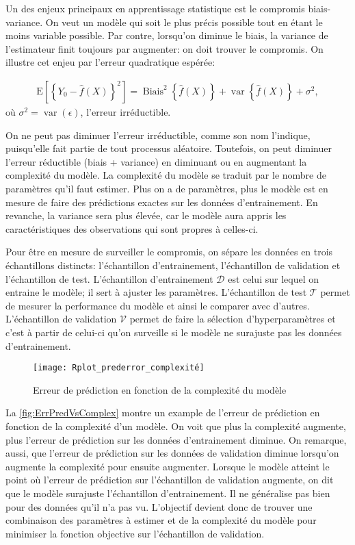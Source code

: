 Un des enjeux principaux en apprentissage statistique est le compromis biais-variance. On veut un modèle qui soit le plus précis possible tout en étant le moins variable possible. Par contre, lorsqu'on diminue le biais, la variance de l'estimateur finit toujours par augmenter: on doit trouver le compromis. On illustre cet enjeu par l'erreur quadratique espérée:

\begin{align*}\mathrm{E}\left[\left\{Y_{0}-\hat{f}\left(X\right)\right\}^{2}\right]=\operatorname{Biais}^{2}\left\{\hat{f}\left(X\right)\right\}+\operatorname{var}\left\{\hat{f}\left(X\right)\right\}+ \sigma^{2},
\end{align*}
où $\sigma^2=\operatorname{var}\left(\epsilon\right)$, l'erreur irréductible.

On ne peut pas diminuer l'erreur irréductible, comme son nom l'indique, puisqu'elle fait partie de tout processus aléatoire. Toutefois, on peut diminuer l'erreur réductible (biais + variance) en diminuant ou en augmentant la complexité du modèle. La complexité du modèle se traduit par le nombre de paramètres qu'il faut estimer. Plus on a de paramètres, plus le modèle est en mesure de faire des prédictions exactes sur les données d'entrainement. En revanche, la variance sera plus élevée, car le modèle aura appris les caractéristiques  des observations qui sont propres à celles-ci. 

Pour être en mesure de surveiller le compromis, on sépare les données en trois échantillons distincts: l'échantillon d'entrainement, l'échantillon de validation et l'échantillon de test. L'échantillon d'entrainement $\mathcal{D}$ est celui sur lequel on entraine le modèle; il sert à ajuster les paramètres. L'échantillon de test $\mathcal{T}$ permet de mesurer la performance du modèle et ainsi le comparer avec d'autres. L'échantillon de validation $\mathcal{V}$ permet de faire la sélection d'hyperparamètres et c'est à partir de celui-ci qu'on surveille si le modèle ne surajuste pas les données d'entrainement. 

\begin{figure}[h]
\centering
\caption{\label{fig:ErrPredVsComplex}Erreur de prédiction en fonction de la complexité du modèle}
\texttt{[image: Rplot\_prederror\_complexité]}
\end{figure}

La \autoref{fig:ErrPredVsComplex} montre un example de l'erreur de prédiction en fonction de la complexité d'un modèle. On voit que plus la complexité augmente, plus l'erreur de prédiction sur les données d'entrainement diminue. On remarque, aussi, que l'erreur de prédiction sur les données de validation diminue lorsqu'on augmente la complexité pour ensuite augmenter. Lorsque le modèle atteint le point où l'erreur de prédiction sur l'échantillon de validation augmente, on dit que le modèle surajuste l'échantillon d'entrainement. Il ne généralise pas bien pour des données qu'il n'a pas vu. L'objectif devient donc de trouver une combinaison des paramètres à estimer et de la complexité du modèle pour minimiser la fonction objective sur l'échantillon de validation.

